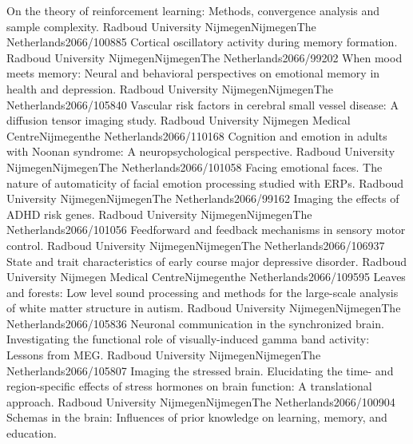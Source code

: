 	{On the theory of reinforcement learning: Methods, convergence analysis and sample complexity.}
	{Radboud University Nijmegen}{Nijmegen}{The Netherlands}{2066/100885}
	{Cortical oscillatory activity during memory formation.}
	{Radboud University Nijmegen}{Nijmegen}{The Netherlands}{2066/99202}
	{When mood meets memory: Neural and behavioral perspectives on emotional memory in health and depression.}
	{Radboud University Nijmegen}{Nijmegen}{The Netherlands}{2066/105840}
	{Vascular risk factors in cerebral small vessel disease: A diffusion tensor imaging study.}
	{Radboud University Nijmegen Medical Centre}{Nijmegen}{the Netherlands}{2066/110168}
	{Cognition and emotion in adults with Noonan syndrome: A neuropsychological perspective.}
	{Radboud University Nijmegen}{Nijmegen}{The Netherlands}{2066/101058}
	{Facing emotional faces. The nature of automaticity of facial emotion processing studied with ERPs.}
	{Radboud University Nijmegen}{Nijmegen}{The Netherlands}{2066/99162}
	{Imaging the effects of ADHD risk genes.}
	{Radboud University Nijmegen}{Nijmegen}{The Netherlands}{2066/101056}
	{Feedforward and feedback mechanisms in sensory motor control.}
	{Radboud University Nijmegen}{Nijmegen}{The Netherlands}{2066/106937}
	{State and trait characteristics of early course major depressive disorder.}
	{Radboud University Nijmegen Medical Centre}{Nijmegen}{the Netherlands}{2066/109595}
	{Leaves and forests: Low level sound processing and methods for the large-scale analysis of white matter structure in autism.}
	{Radboud University Nijmegen}{Nijmegen}{The Netherlands}{2066/105836}
	{Neuronal communication in the synchronized brain. Investigating the functional role of visually-induced gamma band activity: Lessons from MEG.}
	{Radboud University Nijmegen}{Nijmegen}{The Netherlands}{2066/105807}
	{Imaging the stressed brain. Elucidating the time- and region-specific effects of stress hormones on brain function: A translational approach.}
	{Radboud University Nijmegen}{Nijmegen}{The Netherlands}{2066/100904}
	{Schemas in the brain: Influences of prior knowledge on learning, memory, and education.}
